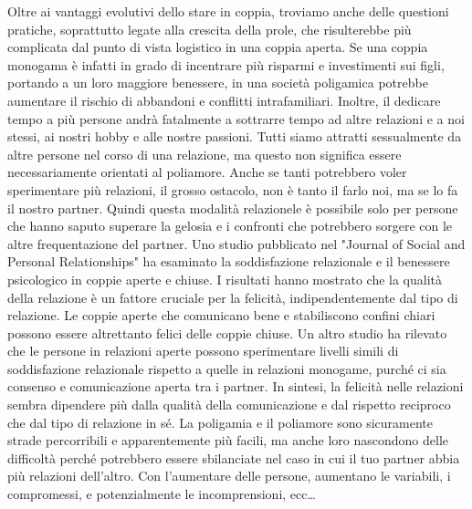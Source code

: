 \documentclass[12pt]{book} %
\begin{document}
Oltre ai vantaggi evolutivi dello stare in coppia, troviamo anche delle questioni pratiche, soprattutto legate alla
crescita della prole, che risulterebbe più complicata dal punto di vista logistico in una coppia aperta. 
Se una coppia monogama è infatti in grado di incentrare più
risparmi e investimenti sui figli, portando a un loro maggiore benessere, in una società poligamica potrebbe aumentare
il rischio di abbandoni e conflitti intrafamiliari. Inoltre, il dedicare tempo a più persone andrà
fatalmente a sottrarre tempo ad altre relazioni e a noi stessi, ai nostri hobby e alle nostre passioni. Tutti siamo
attratti sessualmente da altre persone nel corso di una relazione, ma questo non significa essere necessariamente
orientati al poliamore. Anche se tanti potrebbero voler sperimentare più relazioni, il grosso ostacolo, non è tanto il
farlo noi, ma se lo fa il nostro partner. Quindi questa modalità relazionele è possibile solo per persone che hanno saputo superare la gelosia e i confronti che potrebbero sorgere con le altre frequentazione del partner. 
Uno studio pubblicato nel "Journal of Social and Personal Relationships" ha esaminato la soddisfazione relazionale e il benessere psicologico in coppie aperte e chiuse. I risultati hanno mostrato che la qualità della relazione è un fattore cruciale per la felicità, indipendentemente dal tipo di relazione. Le coppie aperte che comunicano bene e stabiliscono confini chiari possono essere altrettanto felici delle coppie chiuse.
Un altro studio ha rilevato che le persone in relazioni aperte possono sperimentare livelli simili di soddisfazione relazionale rispetto a quelle in relazioni monogame, purché ci sia consenso e comunicazione aperta tra i partner.
In sintesi, la felicità nelle relazioni sembra dipendere più dalla qualità della comunicazione e dal rispetto reciproco che dal tipo di relazione in sé.
La poligamia e il poliamore sono sicuramente strade percorribili e apparentemente più facili, ma anche loro nascondono delle difficoltà perché potrebbero essere sbilanciate nel caso in cui il tuo partner abbia più relazioni dell'altro. Con l'aumentare delle persone, aumentano le variabili, i compromessi, e potenzialmente le incomprensioni, ecc…
\end{document}
